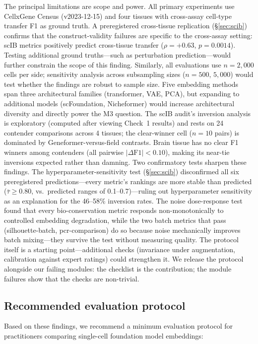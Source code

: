 \documentclass[10pt,letterpaper]{article}
\begin{document}
The principal limitations are scope and power. All primary experiments use CellxGene Census (v2023-12-15) and four tissues with cross-assay cell-type transfer F1 as ground truth. A preregistered cross-tissue replication (\S\ref{sec:scib}) confirms that the construct-validity failures are specific to the cross-assay setting: scIB metrics positively predict cross-tissue transfer ($\rho = +0.63$, $p = 0.0014$). Testing additional ground truths---such as perturbation prediction---would further constrain the scope of this finding. Similarly, all evaluations use $n = 2{,}000$ cells per side; sensitivity analysis across subsampling sizes ($n = 500$, $5{,}000$) would test whether the findings are robust to sample size. Five embedding methods span three architectural families (transformer, VAE, PCA), but expanding to additional models (scFoundation, Nicheformer) would increase architectural diversity and directly power the M3 question. The scIB audit's inversion analysis is exploratory (computed after viewing Check~1 results) and rests on 24 contender comparisons across 4 tissues; the clear-winner cell ($n = 10$ pairs) is dominated by Geneformer-versus-field contrasts. Brain tissue has no clear F1 winners among contenders (all pairwise $|\Delta\text{F1}| < 0.10$), making its near-tie inversions expected rather than damning. Two confirmatory tests sharpen these findings. The hyperparameter-sensitivity test (\S\ref{sec:scib}) disconfirmed all six preregistered predictions---every metric's rankings are more stable than predicted ($\bar{\tau} \geq 0.80$, vs.\ predicted ranges of 0.1--0.7)---ruling out hyperparameter sensitivity as an explanation for the 46--58\% inversion rates. The noise dose-response test found that every bio-conservation metric responds non-monotonically to controlled embedding degradation, while the two batch metrics that pass (silhouette-batch, pcr-comparison) do so because noise mechanically improves batch mixing---they survive the test without measuring quality. The protocol itself is a starting point---additional checks (invariance under augmentation, calibration against expert ratings) could strengthen it. We release the protocol alongside our failing modules: the checklist is the contribution; the module failures show that the checks are non-trivial.

\subsection{Recommended evaluation protocol}

Based on these findings, we recommend a minimum evaluation protocol for practitioners comparing single-cell foundation model embeddings:
\end{document}
